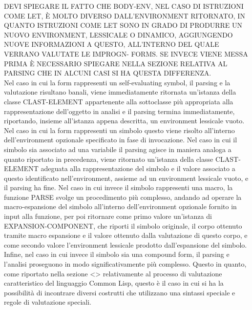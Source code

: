 DEVI SPIEGARE IL FATTO CHE BODY-ENV, NEL CASO DI ISTRUZIONI COME LET, È MOLTO
DIVERSO DALL’ENVIRONMENT RITORNATO, IN QUANTO ISTRUZIONI COME LET SONO IN
GRADO DI PRODURRE UN NUOVO ENVIRONMENT, LESSICALE O DINAMICO, AGGIUNGENDO
NUOVE INFORMAZIONI A QUESTO, ALL’INTERNO DEL QUALE VERRANO VALUTATE LE
IMPROGN- FORMS. SE INVECE VIENE MESSA PRIMA È NECESSARIO SPIEGARE NELLA
SEZIONE RELATIVA AL PARSING CHE IN ALCUNI CASI SI HA QUESTA DIFFERENZA.\\

Nel caso in cui la form rappresenti un self-evaluating symbol, il parsing e la
valutazione risultano banali, viene immediatamente ritornata un’istanza della
classe CLAST-ELEMENT appartenente alla sottoclasse più appropriata alla
rappresentazione dell’oggetto in analisi e il parsing termina immediatamente,
riportando, insieme all’istanza appena descritta, un environment lessicale
vuoto.\\

Nel caso in cui la form rappresenti un simbolo questo viene risolto
all’interno dell’environment opzionale specificato in fase di invocazione. Nel
caso in cui il simbolo sia associato ad una variabile il parsing agisce in
maniera analoga a quanto riportato in precedenza, viene ritornato un’istanza
della classe CLAST-ELEMENT adeguata alla rappresentazione del simbolo e il
valore associato a questo identificato nell’environment, assieme ad un
environment lessicale vuoto, e il parsing ha fine. Nel caso in cui invece il
simbolo rappresenti una macro, la funzione PARSE svolge un procedimento più
complesso, andando ad operare la macro-espansione del simbolo all’interno
dell’environment opzionale fornito in input alla funzione, per poi ritornare
come primo valore un’istanza di EXPANSION-COMPONENT, che riporti il simbolo
originale, il corpo ottenuto tramite macro espansione e il valore ottenuto
dalla valutazione di questo corpo, e come secondo valore l’environment
lessicale prodotto dall’espansione del simbolo.\\

Infine, nel caso in cui invece il simbolo sia una compound form, il parsing e
l’analisi proseguono in modo significativamente più complesso. Questo in
quanto, come riportato nella sezione <> relativamente al processo di
valutazione caratteristico del linguaggio Common Lisp, questo è il caso in cui
si ha la possibilità di incontrare diversi costrutti che utilizzano una
sintassi speciale e regole di valutazione speciali.\\

